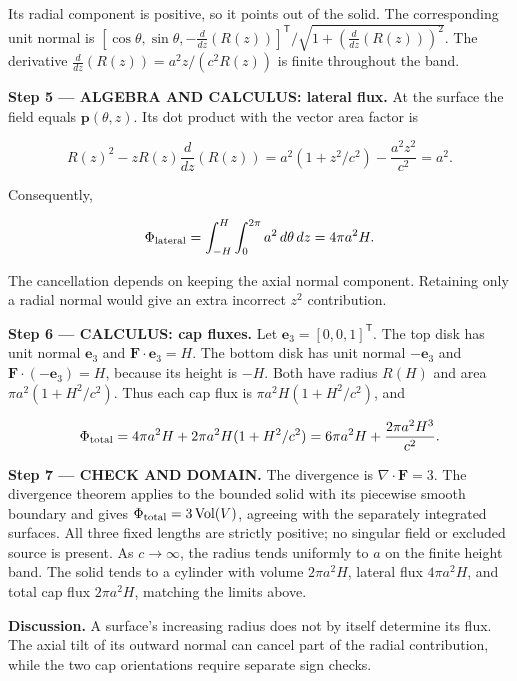 \documentclass[11pt,oneside,openany]{book}
\begin{document}
Its radial component is positive, so it points out of the solid. The corresponding unit normal is \([\cos\theta,\sin\theta,-\frac{d}{dz}(R(z))]^{\mathsf T}/\sqrt{1+(\frac{d}{dz}(R(z)))^2}\). The derivative \(\frac{d}{dz}(R(z))=a^2z/(c^2R(z))\) is finite throughout the band.

\begingroup\color{AlgebraBlue}
\textbf{Step 5 --- ALGEBRA AND CALCULUS: lateral flux.} At the surface the field equals \(\mathbf p(\theta,z)\). Its dot product with the vector area factor is

\[
R(z)^2-zR(z)\frac{d}{dz}(R(z))
=a^2(1+z^2/c^2)-\frac{a^2z^2}{c^2}=a^2.
\]

Consequently,

\[
\Phi_{\rm lateral}=\int_{-H}^{H}\int_0^{2\pi}a^2\,d\theta\,dz
=4\pi a^2H.
\]

The cancellation depends on keeping the axial normal component. Retaining only a radial normal would give an extra incorrect \(z^2\) contribution.

\endgroup
\textbf{Step 6 --- CALCULUS: cap fluxes.} Let \(\mathbf e_3=[0,0,1]^{\mathsf T}\). The top disk has unit normal \(\mathbf e_3\) and \(\mathbf F\cdot\mathbf e_3=H\). The bottom disk has unit normal \(-\mathbf e_3\) and \(\mathbf F\cdot(-\mathbf e_3)=H\), because its height is \(-H\). Both have radius \(R(H)\) and area \(\pi a^2(1+H^2/c^2)\). Thus each cap flux is \(\pi a^2H(1+H^2/c^2)\), and

\[
\Phi_{\rm total}=4\pi a^2H+2\pi a^2H(1+H^2/c^2)
=6\pi a^2H+\frac{2\pi a^2H^3}{c^2}.
\]

\begin{DomainStep}
\textbf{Step 7 --- CHECK AND DOMAIN.} The divergence is \(\nabla\cdot\mathbf F=3\). The divergence theorem applies to the bounded solid with its piecewise smooth boundary and gives \(\Phi_{\rm total}=3\operatorname{Vol}(V)\), agreeing with the separately integrated surfaces. All three fixed lengths are strictly positive; no singular field or excluded source is present. As \(c\to\infty\), the radius tends uniformly to \(a\) on the finite height band. The solid tends to a cylinder with volume \(2\pi a^2H\), lateral flux \(4\pi a^2H\), and total cap flux \(2\pi a^2H\), matching the limits above.

\end{DomainStep}
\textbf{Discussion.} A surface's increasing radius does not by itself determine its flux. The axial tilt of its outward normal can cancel part of the radial contribution, while the two cap orientations require separate sign checks.
\clearpage
\end{document}
